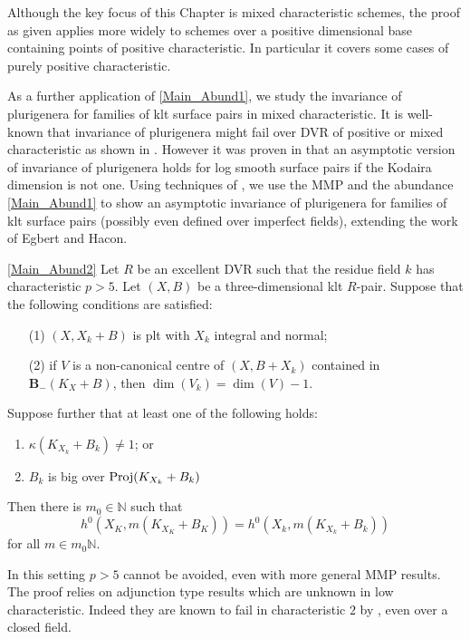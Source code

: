 \documentclass[a4paper,12pt]{book}
\begin{document}
	Although the key focus of this Chapter is mixed characteristic schemes, the proof as given applies more widely to schemes over a positive dimensional base containing points of positive characteristic. In particular it covers some cases of purely positive characteristic.
	
	As a further application of \autoref{Main_Abund1}, we study the invariance of plurigenera for families of klt surface pairs in mixed characteristic.
	It is well-known that invariance of plurigenera might fail over DVR of positive or mixed characteristic as shown in \cite{KU, Suh08, Bri20}.
	However it was proven in \cite{EH} that an asymptotic version of invariance of plurigenera holds for log smooth surface pairs if the Kodaira dimension is not one.
	Using techniques of \cite{HMX18}, we use the MMP and the abundance \autoref{Main_Abund1} to show an asymptotic invariance of plurigenera for families of klt surface pairs (possibly even defined over imperfect fields), extending the work of Egbert and Hacon.
	
	\begin{theo}\autoref{Main_Abund2}
		Let $R$ be an excellent DVR such that the residue field $k$ has characteristic $p>5$.
		Let $(X,B)$ be a three-dimensional klt $R$-pair. Suppose that the following conditions are satisfied:
		\begin{enumerate}
			\item[(1)] $(X,X_{k}+B)$ is plt with $X_k$ integral and normal;
			\item[(2)] if $V$ is a non-canonical centre of $(X,B+X_k)$ contained in ${\mathbf{B}_{-}(K_{X}+B)}$, then $\dim (V_{k})=\dim (V) -1$.
		\end{enumerate}
		Suppose further that at least one of the following holds:
		\begin{enumerate}
			\item $\kappa(K_{X_{k}}+B_{k}) \neq 1$; or
			\item $B_{k}$ is big over $\textup{Proj}(K_{X_{k}}+B_{k})$
		\end{enumerate}	
		Then there is $m_{0} \in \mathbb{N}$ such that 
		$$h^{0}(X_{K},m(K_{X_{K}}+B_{K}))=h^{0}(X_{k},m(K_{X_{k}}+B_{k}))$$
		for all $m \in m_{0}\mathbb{N}$.
		
	\end{theo}
	
	In this setting $p>5$ cannot be avoided, even with more general MMP results. The proof relies on adjunction type results which are unknown in low characteristic. Indeed they are known to fail in characteristic $2$ by \cite{cascini2019purely}, even over a closed field.
	
\end{document}
